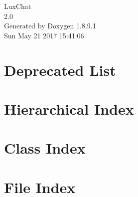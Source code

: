 \documentclass[twoside]{book}
\newcommand{\+}{\discretionary{\mbox{\scriptsize$\hookleftarrow$}}{}{}}
\newcommand{\clearemptydoublepage}{%
  \newpage{\pagestyle{empty}\cleardoublepage}%
}
\begin{document}
\hypersetup{pageanchor=false,
             bookmarks=true,
             bookmarksnumbered=true,
             pdfencoding=unicode
            }
\begin{titlepage}
\vspace*{7cm}
\begin{center}%
{\Large Lux\+Chat \\[1ex]\large 2.\+0 }\\
\vspace*{1cm}
{\large Generated by Doxygen 1.8.9.1}\\
\vspace*{0.5cm}
{\small Sun May 21 2017 15:41:06}\\
\end{center}
\end{titlepage}
\clearemptydoublepage
\tableofcontents
\clearemptydoublepage
{}
\hypersetup{pageanchor=true}

\chapter{Deprecated List}
\label{deprecated}
\hypertarget{deprecated}{}

\chapter{Hierarchical Index}

\chapter{Class Index}

\chapter{File Index}

\end{document}
